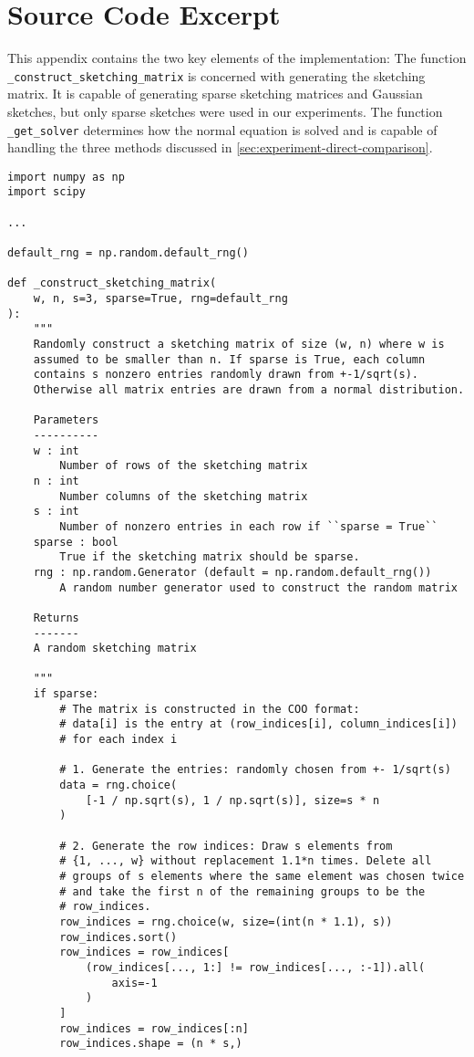 \chapter{Source Code Excerpt}

This appendix contains the two key elements of the implementation:
The function \texttt{_construct_sketching_matrix} is concerned with generating the sketching matrix.
It is capable of generating sparse sketching matrices and Gaussian sketches, but only sparse sketches were used in our experiments.
The function \texttt{_get_solver} determines how the normal equation is solved and is capable of handling the three methods discussed in \cref{sec:experiment-direct-comparison}.

\begin{verbatim}
import numpy as np
import scipy

...

default_rng = np.random.default_rng()

def _construct_sketching_matrix(
    w, n, s=3, sparse=True, rng=default_rng
):
    """
    Randomly construct a sketching matrix of size (w, n) where w is
    assumed to be smaller than n. If sparse is True, each column
    contains s nonzero entries randomly drawn from +-1/sqrt(s).
    Otherwise all matrix entries are drawn from a normal distribution.

    Parameters
    ----------
    w : int
        Number of rows of the sketching matrix
    n : int
        Number columns of the sketching matrix
    s : int
        Number of nonzero entries in each row if ``sparse = True``
    sparse : bool
        True if the sketching matrix should be sparse.
    rng : np.random.Generator (default = np.random.default_rng())
        A random number generator used to construct the random matrix

    Returns
    -------
    A random sketching matrix

    """
    if sparse:
        # The matrix is constructed in the COO format:
        # data[i] is the entry at (row_indices[i], column_indices[i])
        # for each index i

        # 1. Generate the entries: randomly chosen from +- 1/sqrt(s)
        data = rng.choice(
            [-1 / np.sqrt(s), 1 / np.sqrt(s)], size=s * n
        )

        # 2. Generate the row indices: Draw s elements from
        # {1, ..., w} without replacement 1.1*n times. Delete all
        # groups of s elements where the same element was chosen twice
        # and take the first n of the remaining groups to be the
        # row_indices.
        row_indices = rng.choice(w, size=(int(n * 1.1), s))
        row_indices.sort()
        row_indices = row_indices[
            (row_indices[..., 1:] != row_indices[..., :-1]).all(
                axis=-1
            )
        ]
        row_indices = row_indices[:n]
        row_indices.shape = (n * s,)


\end{verbatim}
